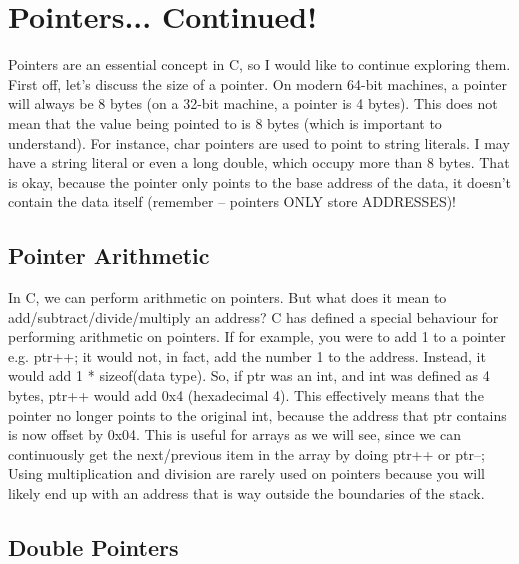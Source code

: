 \documentclass{article}
\begin{document}
\section{Pointers... Continued!}

Pointers are an essential concept in C, so I would like to continue exploring them. First off, let’s discuss
the size of a pointer. On modern 64-bit machines, a pointer will always be 8 bytes (on a 32-bit machine, a
pointer is 4 bytes). This does not mean that the value being pointed to is 8 bytes (which is important to
understand). For instance, char pointers are used to point to string literals. I may have a string literal or
even a long double, which occupy more than 8 bytes. That is okay, because the pointer only points to the base
address of the data, it doesn’t contain the data itself (remember – pointers ONLY store ADDRESSES)!

\subsection{Pointer Arithmetic}

In C, we can perform arithmetic on pointers. But what does it mean to add/subtract/divide/multiply an
address? C has defined a special behaviour for performing arithmetic on pointers. If for example, you were to
add 1 to a pointer e.g. ptr++; it would not, in fact, add the number 1 to the address. Instead, it would add
1 * sizeof(data type). So, if ptr was an int, and int was defined as 4 bytes, ptr++ would add 0x4
(hexadecimal 4). This effectively means that the pointer no longer points to the original int, because the
address that ptr contains is now offset by 0x04. This is useful for arrays as we will see, since we can
continuously get the next/previous item in the array by doing ptr++ or ptr--; Using multiplication and
division are rarely used on pointers because you will likely end up with an address that is way outside the
boundaries of the stack.

\subsection{Double Pointers}
\end{document}
